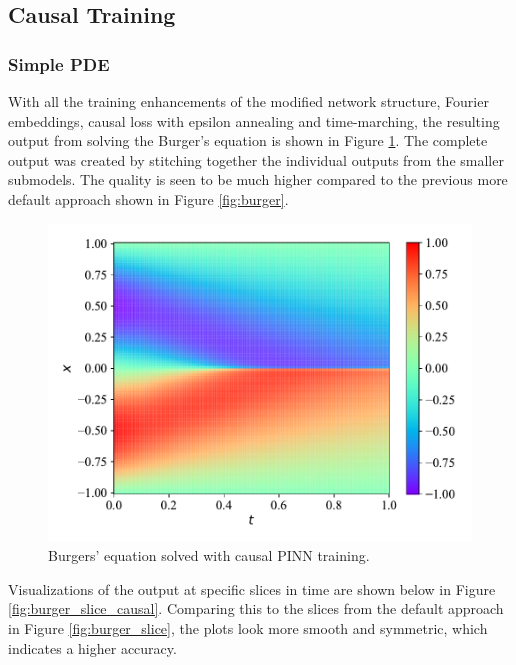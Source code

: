 \subsection{Causal Training}

\subsubsection{Simple PDE}

With all the training enhancements of the modified network structure, Fourier embeddings, causal loss with epsilon annealing and time-marching, the resulting output from solving the Burger's equation is shown in Figure \ref{fig:causal_burger}. The complete output was created by stitching together the individual outputs from the smaller submodels. The quality is seen to be much higher compared to the previous more default approach shown in Figure \ref{fig:burger}.

\begin{figure}[H]
    \centering
    \includegraphics[width=1.0\linewidth]{Figures/IntermediateExperiments/Causality/Burger/burger.pdf}
    \caption{Burgers' equation solved with causal PINN training.}
    \label{fig:causal_burger}
\end{figure}

Visualizations of the output at specific slices in time are shown below in Figure \ref{fig:burger_slice_causal}. Comparing this to the slices from the default approach in Figure \ref{fig:burger_slice}, the plots look more smooth and symmetric, which indicates a higher accuracy.

